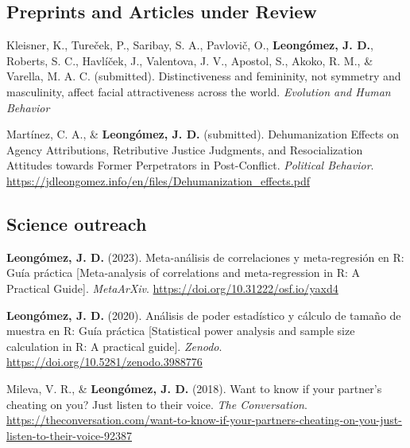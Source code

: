 \documentclass[11pt,a4paper,]{awesome-cv}
\begin{document}
\endgroup

\hypertarget{section-1}{%
\subsection{\texorpdfstring{\textbf{Preprints and Articles under Review}}{}}\label{section-1}}

\begingroup
\footnotesize
\setlength{\parindent}{-0.5in}
\setlength{\leftskip}{0.5in}

Kleisner, K., Tureček, P., Saribay, S. A., Pavlovič, O.,
\textbf{Leongómez, J. D.}, Roberts, S. C., Havlíček, J., Valentova, J.
V., Apostol, S., Akoko, R. M., \& Varella, M. A. C. (submitted).
Distinctiveness and femininity, not symmetry and masculinity, affect
facial attractiveness across the world. \emph{Evolution and Human
Behavior}

Martínez, C. A., \& \textbf{Leongómez, J. D.} (submitted).
Dehumanization Effects on Agency Attributions, Retributive Justice
Judgments, and Resocialization Attitudes towards Former Perpetrators in
Post-Conflict. \emph{Political Behavior}.
\url{https://jdleongomez.info/en/files/Dehumanization_effects.pdf}

\endgroup

\hypertarget{section-2}{%
\subsection{\texorpdfstring{\textbf{Science outreach}}{}}\label{section-2}}

\begingroup
\footnotesize
\setlength{\parindent}{-0.5in}
\setlength{\leftskip}{0.5in}

\textbf{Leongómez, J. D.} (2023). Meta-análisis de correlaciones y
meta-regresión en R: Guía práctica {[}Meta-analysis of correlations and
meta-regression in R: A Practical Guide{]}. \emph{MetaArXiv}.
\url{https://doi.org/10.31222/osf.io/yaxd4}

\textbf{Leongómez, J. D.} (2020). Análisis de poder estadístico y
cálculo de tamaño de muestra en R: Guía práctica {[}Statistical power
analysis and sample size calculation in R: A practical guide{]}.
\emph{Zenodo}. \url{https://doi.org/10.5281/zenodo.3988776}

Mileva, V. R., \& \textbf{Leongómez, J. D.} (2018). Want to know if your
partner's cheating on you? Just listen to their voice. \emph{The
Conversation}.
\url{https://theconversation.com/want-to-know-if-your-partners-cheating-on-you-just-listen-to-their-voice-92387}
\end{document}

